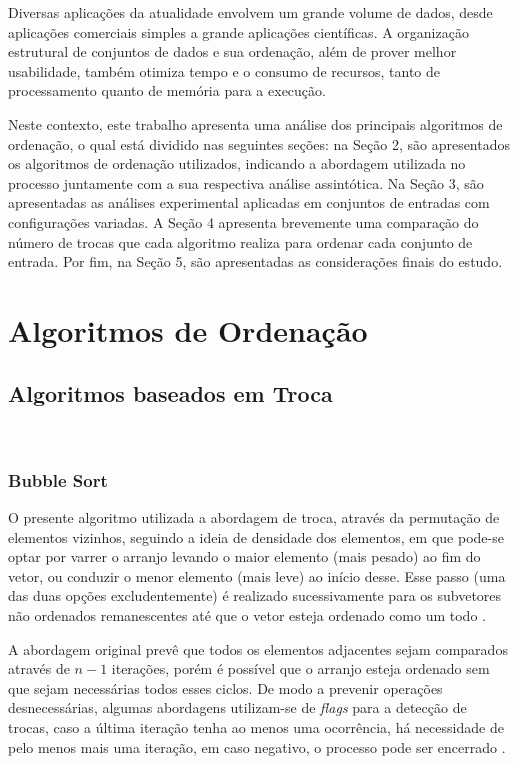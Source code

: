 \documentclass[conference,onecolumn]{IEEEtran}
\begin{document}
Diversas aplicações da atualidade envolvem um grande volume de dados, desde aplicações comerciais simples a grande aplicações científicas. A organização estrutural de conjuntos de dados e sua ordenação, além de prover melhor usabilidade, também otimiza tempo e o consumo de recursos, tanto de processamento quanto de memória para a execução.

Neste contexto, este trabalho apresenta uma análise dos principais algoritmos de ordenação, o qual está dividido nas seguintes seções: na Seção 2, são apresentados os algoritmos de ordenação utilizados, indicando a abordagem utilizada no processo juntamente com a sua respectiva análise assintótica. Na Seção 3, são apresentadas as análises experimental aplicadas em conjuntos de entradas com configurações variadas. A Seção 4 apresenta brevemente uma comparação do número de trocas que cada algoritmo realiza para ordenar cada conjunto de entrada. Por fim, na Seção 5, são apresentadas as considerações finais do estudo.


\section{Algoritmos de Ordenação}


\subsection{Algoritmos baseados em Troca}

~\\
\subsubsection{Bubble Sort}

O presente algoritmo utilizada a abordagem de troca, através da permutação de elementos vizinhos, seguindo a ideia de densidade dos elementos, em que pode-se optar por varrer o arranjo levando o maior elemento (mais pesado) ao fim do vetor, ou conduzir o menor elemento (mais leve) ao início desse. Esse passo (uma das duas opções excludentemente) é realizado sucessivamente para os subvetores não ordenados remanescentes até que o vetor esteja ordenado como um todo \cite{biggar}.

A abordagem original prevê que todos os elementos adjacentes sejam comparados através de $n - 1$ iterações, porém é possível que o arranjo esteja ordenado sem que sejam necessárias todos esses ciclos. De modo a prevenir operações desnecessárias, algumas abordagens utilizam-se de \textit{flags} para a detecção de trocas, caso a última iteração tenha ao menos uma ocorrência, há necessidade de pelo menos mais uma iteração, em caso negativo, o processo pode ser encerrado \cite{biggar}.
\end{document}
